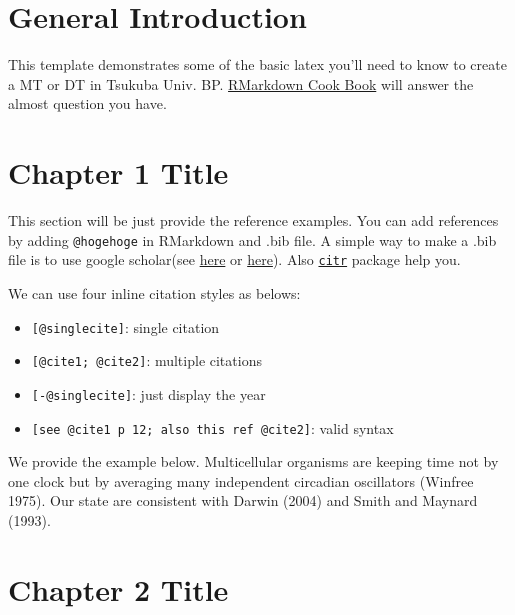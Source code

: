 \documentclass[12pt, a4paper]{report} %
\providecommand{\tightlist}{%
  \setlength{\itemsep}{0pt}\setlength{\parskip}{0pt}}
\begin{document}
\tableofcontents
{}
\newpage
\listoftables
{}
\newpage
\listoffigures
{}
\newpage

\chapter*{General Introduction}
 \parindent=5.3mm

This template demonstrates some of the basic latex you'll need to know
to create a MT or DT in Tsukuba Univ. BP.
\href{https://bookdown.org/yihui/rmarkdown-cookbook/}{RMarkdown Cook
Book} will answer the almost question you have.

\chapter{Chapter 1 Title}
\label{Chap1}

This section will be just provide the reference examples. You can add
references by adding \texttt{@hogehoge} in RMarkdown and .bib file. A
simple way to make a .bib file is to use google scholar(see
\href{https://digitalmeasures.oregonstate.edu/training/export-bibtex-google-scholar}{here}
or
\href{http://ajdkbsuvi.blogspot.com/2011/02/google-scholarbibtex.html}{here}).
Also \href{https://github.com/crsh/citr}{\texttt{citr}} package help
you.

We can use four inline citation styles as belows:

\begin{itemize}
\tightlist
\item
  \texttt{{[}@singlecite{]}}: single citation
\item
  \texttt{{[}@cite1;\ @cite2{]}}: multiple citations
\item
  \texttt{{[}-@singlecite{]}}: just display the year
\item
  \texttt{{[}see\ @cite1\ p\ 12;\ also\ this\ ref\ @cite2{]}}: valid
  syntax
\end{itemize}

We provide the example below. Multicellular organisms are keeping time
not by one clock but by averaging many independent circadian oscillators
(Winfree 1975). Our state are consistent with Darwin (2004) and Smith
and Maynard (1993).

\chapter{Chapter 2 Title}
\label{Chap2}
\end{document}
